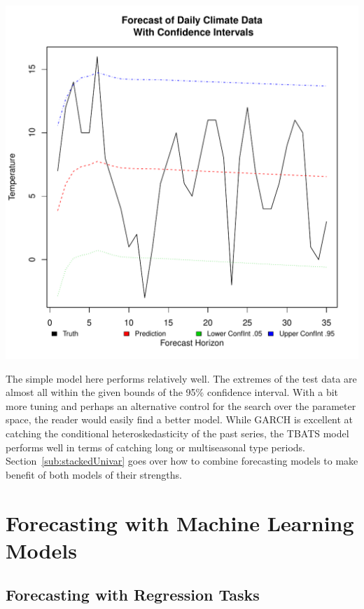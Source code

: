 \documentclass[12pt]{article}\usepackage[]{graphicx}\usepackage[]{color}
\makeatletter
\def\maxwidth{ %
  \ifdim\Gin@nat@width>\linewidth
    \linewidth
  \else
    \Gin@nat@width
  \fi
}
\newenvironment{knitrout}{}{} %
\theoremstyle{definition}
\makeatother
\begin{document}
\begin{knitrout}
\color{fgcolor}
\includegraphics[width=\maxwidth]{figure/trainGarchTuned4-1} 

\end{knitrout}
\doublespacing

The simple model here performs relatively well. The extremes of the test data are almost all within the given bounds of the 95\% confidence interval. With a bit more tuning and perhaps an alternative control for the search over the parameter space, the reader would easily find a better model. While GARCH is excellent at catching the conditional heteroskedasticity of the past series, the TBATS model performs well in terms of catching long or multiseasonal type periods. Section~\ref{sub:stackedUnivar} goes over how to combine forecasting models to make benefit of both models of their strengths.


\section{Forecasting with Machine Learning Models}

\subsection{Forecasting with Regression Tasks}
\end{document}
